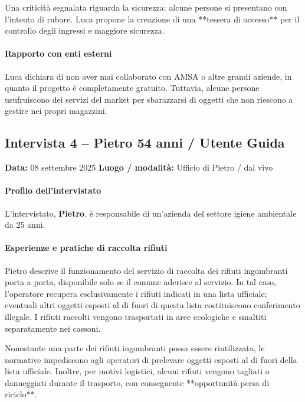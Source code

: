 \documentclass[12pt,a4paper]{article}
\begin{document}
Una criticità segnalata riguarda la sicurezza: alcune persone si presentano con l’intento di rubare. Luca propone la creazione di una **tessera di accesso** per il controllo degli ingressi e maggiore sicurezza.  

\paragraph{Rapporto con enti esterni}

Luca dichiara di non aver mai collaborato con AMSA o altre grandi aziende, in quanto il progetto è completamente gratuito. Tuttavia, alcune persone usufruiscono dei servizi del market per sbarazzarsi di oggetti che non riescono a gestire nei propri magazzini.  

\newpage

\subsection{Intervista 4 – Pietro 54 anni / Utente Guida}
\textbf{Data:} 08 settembre 2025  
\textbf{Luogo / modalità:} Ufficio di Pietro / dal vivo 

\paragraph{Profilo dell’intervistato}

L’intervistato, \textbf{Pietro}, è responsabile di un’azienda del settore igiene ambientale da 25 anni.  

\paragraph{Esperienze e pratiche di raccolta rifiuti}

Pietro descrive il funzionamento del servizio di raccolta dei rifiuti ingombranti porta a porta, disponibile solo se il comune aderisce al servizio. In tal caso, l’operatore recupera esclusivamente i rifiuti indicati in una lista ufficiale; eventuali altri oggetti esposti al di fuori di questa lista costituiscono conferimento illegale. I rifiuti raccolti vengono trasportati in aree ecologiche e smaltiti separatamente nei cassoni.  

Nonostante una parte dei rifiuti ingombranti possa essere riutilizzata, le normative impediscono agli operatori di prelevare oggetti esposti al di fuori della lista ufficiale. Inoltre, per motivi logistici, alcuni rifiuti vengono tagliati o danneggiati durante il trasporto, con conseguente **opportunità persa di riciclo**.  
\end{document}
